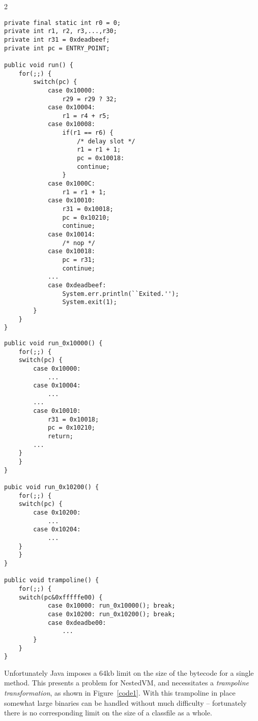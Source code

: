 \documentclass{acmconf}
\begin{document}
\begin{figure*}[t]
\begin{minipage}[c]{7in}%
\begin{multicols}{2}
{\footnotesize\begin{verbatim}
private final static int r0 = 0;
private int r1, r2, r3,...,r30;
private int r31 = 0xdeadbeef;
private int pc = ENTRY_POINT;

public void run() {
    for(;;) {
        switch(pc) {
            case 0x10000:
                r29 = r29 ? 32;
            case 0x10004:
                r1 = r4 + r5;
            case 0x10008:
                if(r1 == r6) {
                    /* delay slot */
                    r1 = r1 + 1;
                    pc = 0x10018:
                    continue;
                }
            case 0x1000C:
                r1 = r1 + 1;
            case 0x10010:
                r31 = 0x10018;
                pc = 0x10210;
                continue;
            case 0x10014:
                /* nop */
            case 0x10018:
                pc = r31;
                continue;
            ...
            case 0xdeadbeef:
                System.err.println(``Exited.'');
                System.exit(1);
        }
    }
}
\end{verbatim}}
\vspace{1in}
{\footnotesize\begin{verbatim}
public void run_0x10000() {
    for(;;) {
    switch(pc) {
        case 0x10000:
            ...
        case 0x10004:
            ...
        ...
        case 0x10010:
            r31 = 0x10018;
            pc = 0x10210;
            return;
        ...
    }
    }
}

pubic void run_0x10200() {
    for(;;) {
    switch(pc) {
        case 0x10200:
            ...
        case 0x10204:
            ...
    }
    }
}

public void trampoline() {
    for(;;) {
    switch(pc&0xfffffe00) {
            case 0x10000: run_0x10000(); break;
            case 0x10200: run_0x10200(); break;
            case 0xdeadbe00:
                ...
        }
    }
}
\end{verbatim}}
\end{multicols}
\end{minipage}
\caption{\label{code1} Trampoline transformation necessitated by Java's 64kb method size limit}
\end{figure*}

Unfortunately Java imposes a 64kb limit on the size of the bytecode
for a single method.  This presents a problem for NestedVM, and
necessitates a {\it trampoline transformation}, as shown in
Figure~\ref{code1}.  With this trampoline in place somewhat large
binaries can be handled without much difficulty -- fortunately there
is no corresponding limit on the size of a classfile as a whole.
\end{document}
